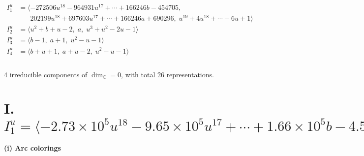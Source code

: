 \documentclass[1p]{elsarticle_modified}
\theoremstyle{definition}
\begin{document}
\begin{align*}
I^u_{1}&=\langle 
-272506 u^{18}-964931 u^{17}+\cdots+166246 b-454705,\\
\phantom{I^u_{1}}&\phantom{= \langle  }202199 u^{18}+697603 u^{17}+\cdots+166246 a+690296,\;u^{19}+4 u^{18}+\cdots+6 u+1\rangle \\
I^u_{2}&=\langle 
u^2+b+u-2,\;a,\;u^3+u^2-2 u-1\rangle \\
I^u_{3}&=\langle 
b-1,\;a+1,\;u^2- u-1\rangle \\
I^u_{4}&=\langle 
b+u+1,\;a+u-2,\;u^2- u-1\rangle \\
\\
\end{align*}
\raggedright * 4 irreducible components of $\dim_{\mathbb{C}}=0$, with total 26 representations.\\
\newpage
\renewcommand{\arraystretch}{1}
\centering \section*{I. $I^u_{1}= \langle -2.73\times10^{5} u^{18}-9.65\times10^{5} u^{17}+\cdots+1.66\times10^{5} b-4.55\times10^{5},\;2.02\times10^{5} u^{18}+6.98\times10^{5} u^{17}+\cdots+1.66\times10^{5} a+6.90\times10^{5},\;u^{19}+4 u^{18}+\cdots+6 u+1 \rangle$}
\flushleft \textbf{(i) Arc colorings}\\
\end{document}
